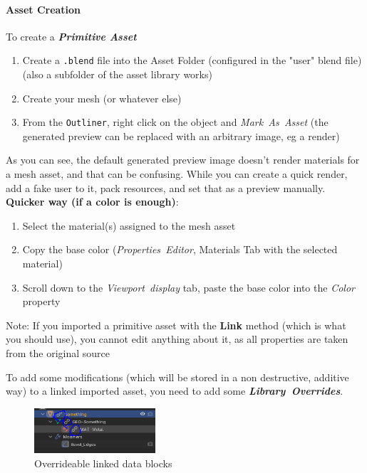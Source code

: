\documentclass{article}
\begin{document}
\paragraph{Asset Creation}
To create a \textbf{\textit{Primitive Asset}}
\begin{enumerate}[noitemsep, topsep=0pt]
    \item Create a \mbox{\texttt{.blend}} file into the Asset Folder (configured in the "user" blend file) (also a subfolder of the asset library works)
    \item Create your mesh (or whatever else)
    \item From the \mbox{\texttt{Outliner}}, right click on the object and \mbox{\textit{Mark As Asset}} (the generated preview can be replaced with an arbitrary image, eg a render)
\end{enumerate}
As you can see, the default generated preview image doesn't render materials for a mesh asset, and that can be confusing. While you can create a quick render, add a fake user to it, 
pack resources, and set that as a preview manually. \textbf{Quicker way (if a color is enough)}:
\begin{enumerate}[noitemsep, topsep=0pt]
    \item Select the material(s) assigned to the mesh asset
    \item Copy the base color (\mbox{\textit{Properties Editor}}, Materials Tab with the selected material)
    \item Scroll down to the \mbox{\textit{Viewport display}} tab, paste the base color into the \textit{Color} property
\end{enumerate}
\begin{center}
    Note: If you imported a primitive asset with the \textbf{Link} method (which is what you should use), you cannot edit anything about it, as all properties are taken from the original 
    source
\end{center}
To add some modifications (which will be stored in a non destructive, additive way) to a linked imported asset, you need to add some \mbox{\textit{\textbf{Library Overrides}}}.
\begin{figure}[t]
    \centering
    \includegraphics[width=0.4\textwidth]{blender_docs_images/my_library_override.png}
    \caption{Overrideable linked data blocks}
    \label{fig:override}
\end{figure}
\end{document}
